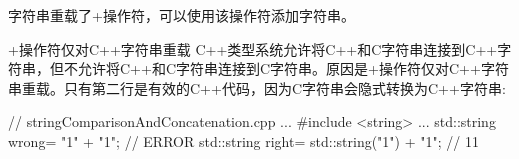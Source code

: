 字符串重载了+操作符，可以使用该操作符添加字符串。

\begin{myWarning}{+操作符仅对C++字符串重载}
C++类型系统允许将C++和C字符串连接到C++字符串，但不允许将C++和C字符串连接到C字符串。原因是+操作符仅对C++字符串重载。只有第二行是有效的C++代码，因为C字符串会隐式转换为C++字符串:
	

\begin{cpp}
// stringComparisonAndConcatenation.cpp
...
#include <string>
...
std::string wrong= "1" + "1"; // ERROR
std::string right= std::string("1") + "1"; // 11
\end{cpp}
\end{myWarning}







